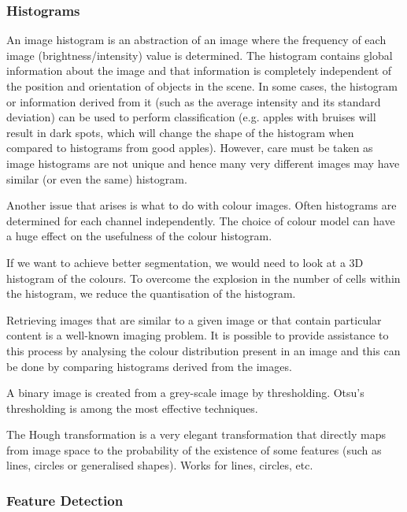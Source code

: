 \subsubsection{Histograms}

An image histogram is an abstraction of an image where the frequency of each image (brightness/intensity) value is determined.
The histogram contains global information about the image and that information is completely independent of the position and orientation of objects in the scene. In some cases, the histogram or information derived from it (such as the average intensity and its standard deviation) can be used to perform classification (e.g. apples with bruises will result in dark spots, which will change the shape of the histogram when compared to histograms from good apples). However, care must be taken as image histograms are not unique and hence many very different images may have similar (or even the same) histogram.

Another issue that arises is what to do with colour images. Often histograms are determined for each channel independently. 
The choice of colour model can have a huge effect on the usefulness of the colour histogram.

If we want to achieve better segmentation, we would need to look at a 3D histogram of the colours.
To overcome the explosion in the number of cells within the histogram, we reduce the quantisation of the histogram. 

Retrieving images that are similar to a given image or that contain particular content is a well-known imaging problem.
It is possible to provide assistance to this process by analysing the colour distribution present in an image and this can be done by comparing histograms derived from the images.

A binary image is created from a grey-scale image by thresholding. 
Otsu's thresholding is among the most effective techniques.

The Hough transformation is a very elegant transformation that directly maps from image space to the probability of the existence of some features (such as lines, circles or generalised shapes). Works for lines, circles, etc.

\subsubsection{Feature Detection}

